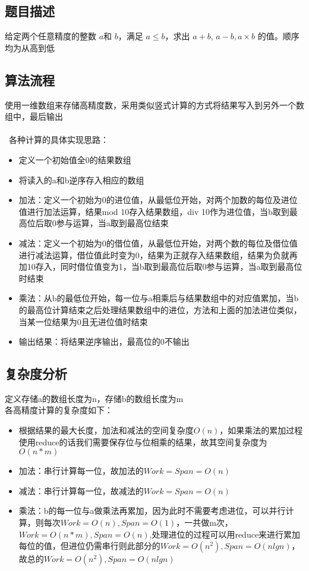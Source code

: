 \documentclass[UTF8,a4paperdui, %
]{ctexart}
\begin{document}
\subsection{题目描述}
给定两个任意精度的整数 $a $和 $b$，满足 $a \leq b$，求出 $a+b$, $a−b, a×b$ 的值。顺序均为从高到低
\subsection{算法流程}
使用一维数组来存储高精度数，采用类似竖式计算的方式将结果写入到另外一个数组中，最后输出\\
\\\
各种计算的具体实现思路：
\begin{itemize}
    \item 定义一个初始值全0的结果数组
    \item 将读入的a和b逆序存入相应的数组
    \item 加法：定义一个初始为0的进位值，从最低位开始，对两个加数的每位及进位值进行加法运算，结果mod 10存入结果数组，div 10作为进位值，当b取到最高位后取0参与运算，当a取到最高位结束
    \item 减法：定义一个初始为0的借位值，从最低位开始，对两个数的每位及借位值进行减法运算，借位值此时变为0，结果为正就存入结果数组，结果为负就再加10存入，同时借位值变为1，当b取到最高位后取0参与运算，当a取到最高位时结束
    \item 乘法：从b的最低位开始，每一位与a相乘后与结果数组中的对应值累加，当b的最高位计算结束之后处理结果数组中的进位，方法和上面的加法进位类似，当某一位结果为0且无进位值时结束
    \item 输出结果：将结果逆序输出，最高位的0不输出
\end{itemize}
\newpage
\subsection{复杂度分析}
定义存储a的数组长度为n，存储b的数组长度为m\\
各高精度计算的复杂度如下：
\begin{itemize}
    \item 根据结果的最大长度，加法和减法的空间复杂度$O(n)$，如果乘法的累加过程使用reduce的话我们需要保存位与位相乘的结果，故其空间复杂度为$O(n*m)$
    \item 加法：串行计算每一位，故加法的$Work=Span=O(n)$
    \item 减法：串行计算每一位，故减法的$Work=Span=O(n)$
    \item 乘法：b的每一位与a做乘法再累加，因为此时不需要考虑进位，可以并行计算，则每次$Work=O(n),Span=O(1)$，一共做m次，$Work=O(n*m),Span=O(n)$,处理进位的过程可以用reduce来进行累加每位的值，但进位仍需串行则此部分的$Work=O(n^2),Span=O(nlgn)$，故总的$Work=O(n^2),Span=O(nlgn)$
\end{itemize}
\end{document}
